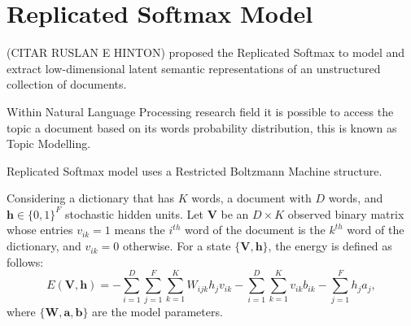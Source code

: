\section{Replicated Softmax Model}%
\label{app:rsm}%

(CITAR RUSLAN E HINTON) proposed the Replicated Softmax to model and extract low-dimensional latent semantic representations of an unstructured collection of documents. 

Within Natural Language Processing research field it is possible to access the topic a document based on its words probability distribution, this is known as Topic Modelling. 

Replicated Softmax model uses a Restricted Boltzmann Machine structure.

Considering a dictionary that has $K$ words, a document with $D$ words, and $\mathbf{h} \in \{0, 1\}^{F}$ stochastic hidden units. Let $\mathbf{V}$ be an $D \times K$ observed binary matrix whose entries $v_{ik} = 1$ means the $i^{th}$ word of the document is the $k^{th}$ word of the dictionary, and $v_{ik} = 0$ otherwise. For a state $\{\mathbf{V}, \mathbf{h}\}$, the energy is defined as follows:
\begin{equation}
    \label{eq:app:rsm-energy-Vh}
    E(\mathbf{V}, \mathbf{h}) = - \sum^{D}_{i = 1} \sum^{F}_{j = 1} \sum^{K}_{k = 1} W_{ijk} h_{j} v_{ik} - \sum^{D}_{i = 1} \sum^{K}_{k = 1} v_{ik} b_{ik} - \sum^{F}_{j = 1} h_{j} a_{j},
\end{equation}
where $\{\mathbf{W}, \mathbf{a}, \mathbf{b}\}$ are the model parameters.

